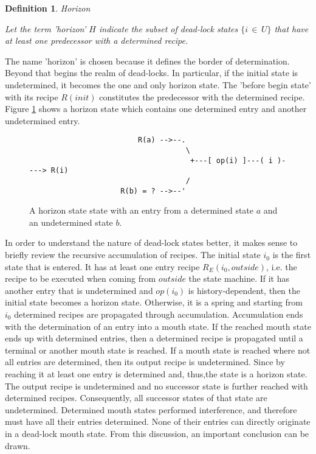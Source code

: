 \documentclass[12pt,a4paper]{scrartcl}
\newtheorem{definition}{Definition}
\begin{document}
\begin{definition}
Horizon

Let the term 'horizon' $H$ indicate the subset of dead-lock states $\{
i\,\in\,U \}$ that have at least one predecessor with a determined recipe.  
\end{definition}

The name 'horizon' is chosen because it defines the border of determination.
Beyond that begins the realm of dead-locks.  In particular, if the initial
state is undetermined, it becomes the one and only horizon state. The 'before
begin state' with its recipe $R(init)$ constitutes the predecessor with the
determined recipe.  Figure \ref{fig:horizon-state} shows a horizon state which
contains one determined entry and another undetermined entry. 


\begin{figure}[htbp] \leavevmode \label{fig:horizon-state}
\begin{verbatim}
                         R(a) -->--.
                                    \
                                     +---[ op(i) ]---( i )----> R(i)
                                    /
                     R(b) = ? -->--'

\end{verbatim}
\caption{A horizon state state with an entry from a determined state $a$ and 
    an undetermined state $b$.}
\end{figure}

In order to understand the nature of dead-lock states better, it makes sense to
briefly review the recursive accumulation of recipes. The initial state $i_0$
is the first state that is entered. It has at least one entry recipe
$R_E(i_0,outside)$, i.e. the recipe to be executed when coming from $outside$
the state machine. If it has another entry that is undetermined and $op(i_0)$
is history-dependent, then the initial state becomes a horizon state.  Otherwise, it
is a spring and starting from $i_0$ determined recipes are propagated through
accumulation.  Accumulation ends with the determination of an entry into a
mouth state. If the reached mouth state ends up with determined entries, then a
determined recipe is propagated until a terminal or another mouth state is
reached. If a mouth state is reached where not all entries are determined, then
its output recipe is undetermined. Since by reaching it at least one entry is
determined and, thus,the state is a horizon state. The output recipe is
undetermined and no successor state is further reached with determined recipes.
Consequently, all successor states of that state are undetermined.  Determined
mouth states performed interference, and therefore must have all their entries
determined.  None of their entries can directly originate in a dead-lock mouth
state. From this discussion, an important conclusion can be drawn.  
\end{document}
